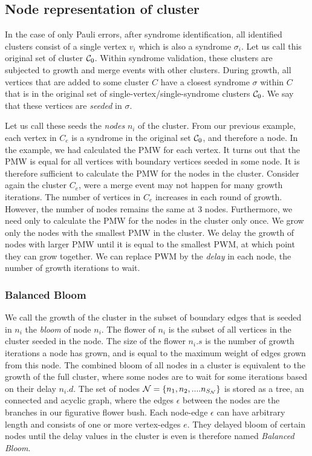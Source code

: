 \subsection{Node representation of cluster}

In the case of only Pauli errors, after syndrome identification, all identified clusters consist of a single vertex $v_i$ which is also a syndrome $\sigma_i$. Let us call this original set of cluster $\mathcal{C}_0$. Within syndrome validation, these clusters are subjected to growth and merge events with other clusters. During growth, all vertices that are added to some cluster $C$ have a closest syndrome $\sigma$ within $C$ that is in the original set of single-vertex/single-syndrome clusters $\mathcal{C}_0$. We say that these vertices are \emph{seeded} in $\sigma$.

Let us call these seeds the \emph{nodes} $n_i$ of the cluster. From our previous example, each vertex in $C_e$ is a syndrome in the original set $\mathcal{C}_0$, and therefore a node. In the example, we had calculated the PMW for each vertex. It turns out that the PMW is equal for all vertices with boundary vertices seeded in some node. It is therefore sufficient to calculate the PMW for the nodes in the cluster. Consider again the cluster $C_e$, were a merge event may not happen for many growth iterations. The number of vertices in $C_e$ increases in each round of growth. However, the number of nodes remains the same at 3 nodes. Furthermore, we need only to calculate the PMW for the nodes in the cluster only once. We grow only the nodes with the smallest PMW in the cluster. We delay the growth of nodes with larger PMW until it is equal to the smallest PWM, at which point they can grow together. We can replace PWM by the \emph{delay} in each node, the number of growth iterations to wait.

\subsubsection{Balanced Bloom}

We call the growth of the cluster in the subset of boundary edges that is seeded in $n_i$ the \emph{bloom} of node $n_i$. The flower of $n_i$ is the subset of all vertices in the cluster seeded in the node. The size of the flower $n_i.s$ is the number of growth iterations a node has grown, and is equal to the maximum weight of edges grown from this node. The combined bloom of all nodes in a cluster is equivalent to the growth of the full cluster, where some nodes are to wait for some iterations based on their delay $n_i.d$. The set of nodes $\mathcal{N} = \{n_1, n_2, .... n_{S_{\mathcal{N}}}\}$ is stored as a tree, an connected and acyclic graph, where the edges $\epsilon$ between the nodes are the branches in our figurative flower bush. Each node-edge $\epsilon$ can have arbitrary length and consists of one or more vertex-edges $e$. They delayed bloom of certain nodes until the delay values in the cluster is even is therefore named \emph{Balanced Bloom}.

